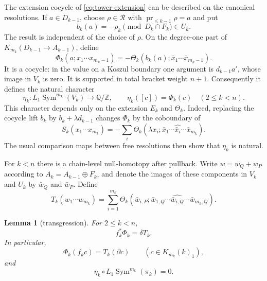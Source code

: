 \documentclass[11pt]{amsart}
\newtheorem{lemma}[theorem]{Lemma}
\theoremstyle{remark}
\newcommand{\Z}{\mathbb Z}
\newcommand{\Q}{\mathbb Q}
\newcommand{\Sym}{\operatorname{Sym}}
\newcommand{\Rel}{\mathcal R}
\newcommand{\pr}{\operatorname{pr}}
\begin{document}
The extension cocycle of \eqref{eq:tower-extension} can be described
on the canonical resolutions.  If $a\in D_{k-1}$, choose
$\rho\in\Rel$ with $\pr_{\leq k-1}\rho=a$ and put
\[
 b_k(a)=-\rho_k\pmod{D_k\cap F_k}\in U_k.
\]
The result is independent of the choice of $\rho$.  On the
degree-one part of $K_{m_k}(D_{k-1}\to A_{k-1})$, define
\begin{equation}\label{eq:phi-k}
 \Phi_k(a;x_1\cdots x_{m_k-1})
 =-\Theta_k(b_k(a);\bar x_1\cdots\bar x_{m_k-1}).
\end{equation}
It is a cocycle: in the value on a Koszul boundary one argument is
$d_{k-1}a'$, whose image in $V_k$ is zero.  It is supported in total
bracket weight $n+1$.  Consequently it defines the natural character
\begin{equation}\label{eq:higher-eta}
 \eta_k:L_1\Sym^{m_k}(V_k)\longrightarrow\Q/\Z,
 \qquad \eta_k([c])=\Phi_k(c)
 \quad(2\leq k<n).
\end{equation}
This character depends only on the extension $E_k$ and $\Theta_k$.
Indeed, replacing the cocycle lift $b_k$ by
$b_k+\lambda d_{k-1}$ changes $\Phi_k$ by the coboundary of
\[
 S_k(x_1\cdots x_{m_k})
 =-\sum_i\Theta_k(\lambda x_i;
       \bar x_1\cdots\widehat{\bar x_i}\cdots\bar x_{m_k}).
\]
The usual comparison maps between free resolutions then show that
$\eta_k$ is natural.

For $k<n$ there is a chain-level null-homotopy after pullback.  Write
$w=w_Q+w_P$ according to $A_k=A_{k-1}\oplus F_k$, and denote the
images of these components in $V_k$ and $U_k$ by $\bar w_Q$ and
$\bar w_P$.  Define
\begin{equation}\label{eq:T-k}
 T_k(w_1\cdots w_{m_k})=
 \sum_{i=1}^{m_k}
 \Theta_k(\bar w_{i,P};
     \bar w_{1,Q}\cdots\widehat{\bar w_{i,Q}}\cdots
     \bar w_{m_k,Q}).
\end{equation}

\begin{lemma}[transgression]\label{lem:transgression}
For $2\leq k<n$,
\[
                         f_k^*\Phi_k=\delta T_k.
\]
In particular,
\begin{equation}\label{eq:chain-transgression}
 \Phi_k(f_kc)=T_k(\partial c)
 \qquad(c\in K_{m_k}(k)_1),
\end{equation}
and
\begin{equation}\label{eq:higher-vanishing}
 \eta_k\circ L_1\Sym^{m_k}(\pi_k)=0.
\end{equation}
\end{lemma}
\end{document}
